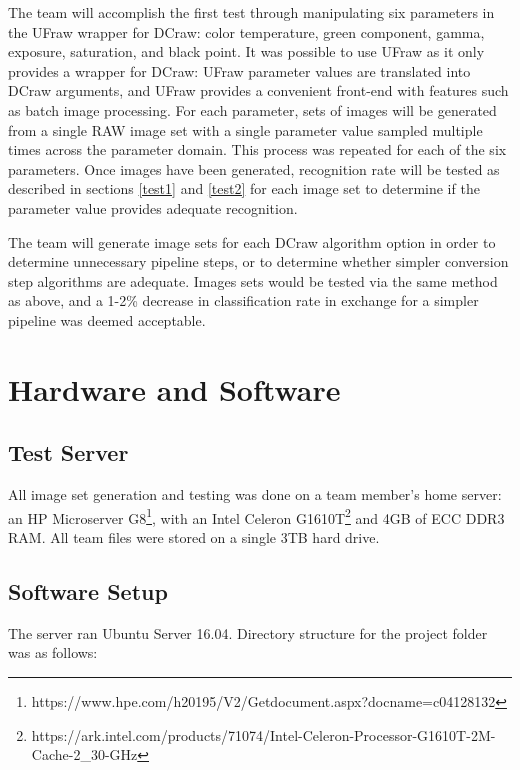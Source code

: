 \documentclass{report}
\begin{document}
The team will accomplish the first test through manipulating six parameters in the UFraw wrapper for DCraw: color temperature, green component, gamma, exposure, saturation, and black point. It was possible to use UFraw as it only provides a wrapper for DCraw: UFraw parameter values are translated into DCraw arguments, and UFraw provides a convenient front-end with features such as batch image processing. For each parameter, sets of images will be generated from a single RAW image set with a single parameter value sampled multiple times across the parameter domain. This process was repeated for each of the six parameters. Once images have been generated, recognition rate will be tested as described in sections \ref{test1} and \ref{test2} for each image set to determine if the parameter value provides adequate recognition.

The team will generate image sets for each DCraw algorithm option in order to determine unnecessary pipeline steps, or to determine whether simpler conversion step algorithms are adequate. Images sets would be tested via the same method as above, and a 1-2\% decrease in classification rate in exchange for a simpler pipeline was deemed acceptable.

\section{Hardware and Software}

\subsection{Test Server}
All image set generation and testing was done on a team member's home server: an HP Microserver G8\footnote{https://www.hpe.com/h20195/V2/Getdocument.aspx?docname=c04128132}, with an Intel Celeron G1610T\footnote{https://ark.intel.com/products/71074/Intel-Celeron-Processor-G1610T-2M-Cache-2\_30-GHz} and 4GB of ECC DDR3 RAM. All team files were stored on a single 3TB hard drive.
\subsection{Software Setup}
\label{ssetup}
The server ran Ubuntu Server 16.04. Directory structure for the project folder was as follows:

\end{document}
